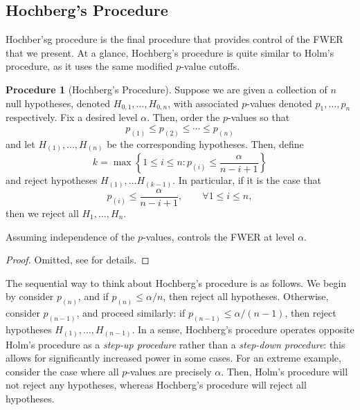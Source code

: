 \documentclass[11pt,reqno]{report}
\theoremstyle{definition}
\newtheorem{proc}[theorem]{Procedure}
\numberwithin{equation}{section}
\begin{document}
\subsection{Hochberg's Procedure}
Hochber'sg procedure is the final procedure that provides control of the FWER that we present. At a glance, Hochberg's procedure is quite similar to Holm's procedure, as it uses the same modified $p$-value cutoffs.
\begin{proc}[Hochberg's Procedure]
\label{hochproc}
Suppose we are given a collection of $n$ null hypotheses, denoted $H_{0, 1}, \ldots, H_{0, n}$, with associated $p$-values denoted $p_1, \ldots, p_n$ respectively. Fix a desired level $\alpha$. Then, order the $p$-values so that
\[ p_{(1)} \leq p_{(2)} \leq \cdots \leq p_{(n)} \] and let $H_{(1)}, \ldots, H_{(n)}$ be the corresponding hypotheses. Then, define
\[ k = \max \left\{ 1 \leq i \leq n : p_{(i)} \leq \frac{\alpha}{n - i + 1} \right \}  \] and reject hypotheses $H_{(1)}, \ldots H_{(k-1)}$. In particular, if it is the case that 
\[ p_{(i)} \leq \frac{\alpha}{n - i + 1}, \qquad \forall 1 \leq i \leq n, \] then we reject all $H_1, \ldots, H_n$.
\end{proc}
\begin{prop}
Assuming independence of the $p$-values,  controls the FWER at level $\alpha$.
\end{prop}
\begin{proof}
Omitted, see \cite{stat300} for details.
\end{proof}

\begin{note*}
The sequential way to think about Hochberg's procedure is as follows. We begin by consider $p_{(n)}$, and if $p_{(n)} \leq \alpha / n$, then reject all hypotheses. Otherwise, consider $p_{(n-1)}$, and proceed similarly: if $p_{(n-1)} \leq \alpha / (n-1)$, then reject hypotheses $H_{(1)}, \ldots, H_{(n-1)}$. In a sense, Hochberg's procedure operates opposite Holm's procedure as a \emph{step-up procedure} rather than a \emph{step-down procedure}: this allows for significantly increased power in some cases. For an extreme example, consider the case where all $p$-values are precisely $\alpha$. Then, Holm's procedure will not reject any hypotheses, whereas Hochberg's procedure will reject all hypotheses. 
\end{note*}
\end{document}
